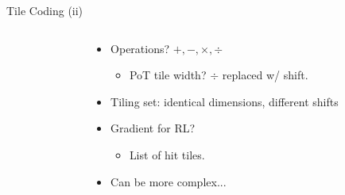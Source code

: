 \documentclass[aspectratio=169,xcolor={dvipsnames}
]{beamer}
\begin{document}
\begin{frame}{Tile Coding (ii)}
\begin{columns}
\begin{column}{0.6\linewidth}
{\begin{tikzpicture}
				\end{tikzpicture}
			}
		\end{column}
		\begin{column}{0.4\linewidth}
			\begin{itemize}[<+->]
				\item Operations? $+, -, \times, \div$
				\begin{itemize}[<+->]
					\item PoT tile width? $\div$ replaced w/ shift.
				\end{itemize}
				\item Tiling set: identical dimensions, different shifts
				\item Gradient for RL?
				\begin{itemize}[<+->]
					\item List of hit tiles.
				\end{itemize}
				\item Can be more complex...
			\end{itemize}
		\end{column}
	\end{columns}
\end{frame}
\end{document}
